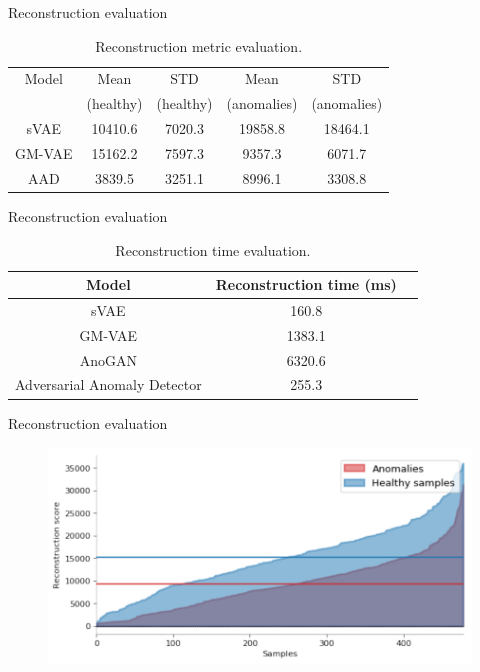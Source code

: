 \documentclass[15pt]{beamer} %
\begin{document}
\begin{frame}{Reconstruction evaluation}
 \begin{table}
    \centering
    \caption[Reconstruction metric evaluation]{Reconstruction metric evaluation.}
    \begin{tabular}{ c c c c c }
        \hline
        Model & Mean & STD & Mean & STD \\
        & (healthy) & (healthy) & (anomalies) & (anomalies) \\
        \hline
        sVAE & 10410.6 & 7020.3 & 19858.8 & 18464.1 \\
        GM-VAE & 15162.2 & 7597.3 & 9357.3 & 6071.7 \\
        AAD & 3839.5 & 3251.1 & 8996.1 & 3308.8 \\
        \hline
    \end{tabular}
\end{table}
\end{frame}


\begin{frame}{Reconstruction evaluation}
 \begin{table}[htb]
    \caption[Reconstruction time evaluation]{Reconstruction time evaluation.}
    \label{table:rec_time}
    \centering
    \begin{tabular}{ c c c }
        \hline
        Model & Reconstruction time (ms) \\
        \hline
        sVAE & 160.8 \\
        GM-VAE & 1383.1 \\
        AnoGAN & 6320.6 \\
        Adversarial Anomaly Detector & 255.3 \\
        \hline
    \end{tabular}
\end{table}
\end{frame}

\begin{frame}{Reconstruction evaluation}
 \begin{figure}
   \centering
   \includegraphics[width=.85\textwidth]{rec_gmvae_eval}
  \end{figure}
\end{frame}
\end{document}
